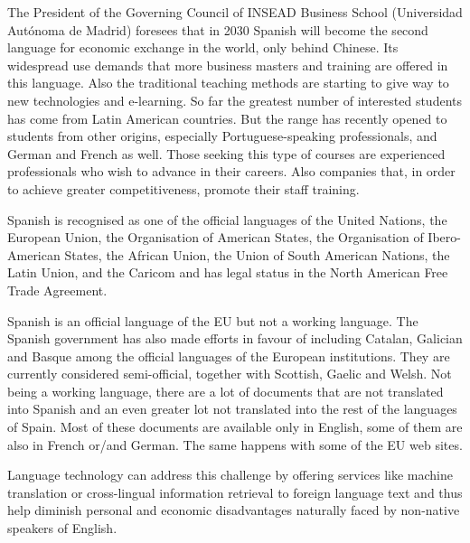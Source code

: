 \begin{multicols}{2}

The President of the Governing Council of INSEAD Business School (Universidad Autónoma de Madrid) foresees that in 2030 Spanish will become the second language for economic exchange in the world, only behind Chinese. Its widespread use demands that more business masters and training are offered in this language. Also the traditional teaching methods are starting to give way to new technologies and e-learning. So far the greatest number of interested students has come from Latin American countries. But the range has recently opened to students from other origins, especially Portuguese-speaking professionals, and German and French as well. Those seeking this type of courses are experienced professionals who wish to advance in their careers. Also companies that, in order to achieve greater competitiveness, promote their staff training.


Spanish is recognised as one of the official languages of the United Nations, the European Union, the Organisation of American States, the Organisation of Ibero-American States, the African Union, the Union of South American Nations, the Latin Union, and the Caricom and has legal status in the North American Free Trade Agreement.

Spanish is an official language of the EU but not a working language. The Spanish government has also made efforts in favour of including Catalan, Galician and Basque among the official languages of the European institutions. They are currently considered semi-official, together with Scottish, Gaelic and Welsh. Not being a working language, there are a lot of documents that are not translated into Spanish and an even greater lot not translated into the rest of the languages of Spain. Most of these documents are available only in English, some of them are also in French or/and German. The same happens with some of the EU web sites.


Language technology can address this challenge by offering services like machine translation or cross-lingual information retrieval to foreign language text and thus help diminish personal and economic disadvantages naturally faced by non-native speakers of English.


\end{multicols}
